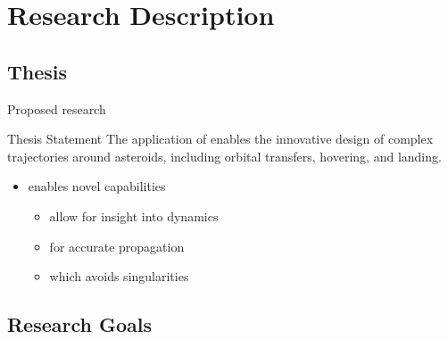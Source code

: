
\section*{Research Description}
\subsection*{Thesis}

\begin{frame}[t]{Proposed research}
    \begin{block}{Thesis Statement}
        The application of  enables the innovative design of complex trajectories around asteroids, including orbital transfers, hovering, and landing.
    \end{block}
    \pause
    \begin{itemize}
        \item {} enables novel capabilities
        \begin{itemize}     
            \item {} allow for insight into dynamics
            \item {} for accurate propagation
            \item {} which avoids singularities
        \end{itemize}
    \end{itemize}

\end{frame}

\subsection*{Research Goals}

